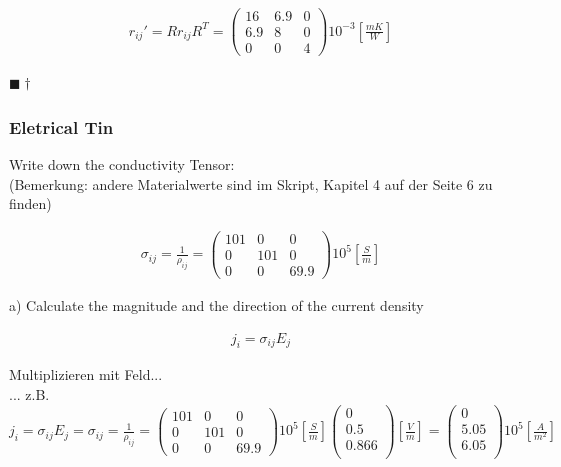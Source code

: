\documentclass[a4paper, 10pt]{scrartcl}
\newcommand{\qed}{\begin{flushright}
		$\blacksquare \dagger$ \end{flushright}}
\begin{document}
\begin{align}
	r_{ij}'=Rr_{ij}R^{T} = \begin{pmatrix}
		16 & 6.9 & 0 \\
		6.9 & 8 & 0 \\
		0 & 0 & 4
	\end{pmatrix}
	10^{-3}[\frac{mK}{W}] 
\end{align}
\qed




\subsubsection{Eletrical Tin}
Write down the conductivity Tensor:\\
(Bemerkung: andere Materialwerte sind im Skript, Kapitel 4 auf der Seite 6 zu finden)

\begin{align}
	\sigma_{ij} = \frac{1}{\rho_{ij}}= \begin{pmatrix}
		101 & 0 & 0 \\
		0 & 101 & 0 \\
		0 & 0 & 69.9 
	\end{pmatrix}
	10^5 [\frac{S}{m}]
\end{align}



a) Calculate the magnitude and the direction of the current density

\begin{align}
	j_i=\sigma_{ij}E_j
\end{align}

Multiplizieren mit Feld...
\\... z.B. $ j_i=\sigma_{ij}E_j = \sigma_{ij} = \frac{1}{\rho_{ij}}= \begin{pmatrix}
101 & 0 & 0 \\
0 & 101 & 0 \\
0 & 0 & 69.9 
\end{pmatrix} 10^5 [\frac{S}{m}] 
\begin{pmatrix}
0 \\
0.5 \\
0.866 \\
\end{pmatrix} [\frac{V}{m}] = 
\begin{pmatrix}
0 \\
5.05 \\
6.05 \\
\end{pmatrix} 10^5 [\frac{A}{m^2}]$
\end{document}
